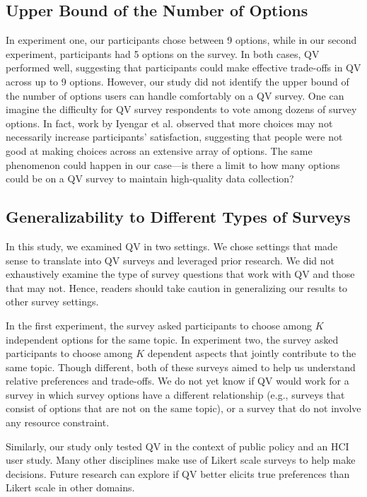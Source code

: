 \subsection{Upper Bound of the Number of Options}

In experiment one, our participants chose between 9 options, while in our second experiment, participants had 5 options on the survey. In both cases, QV performed well, suggesting that participants could make effective trade-offs in QV across up to 9 options. However, our study did not identify the upper bound of the number of options users can handle comfortably on a QV survey. One can imagine the difficulty for QV survey respondents to vote among dozens of survey options. In fact, work by Iyengar et al. \cite{iyengar2000choice} observed that more choices may not necessarily increase participants' satisfaction, suggesting that people were not good at making choices across an extensive array of options. The same phenomenon could happen in our case---is there a limit to how many options could be on a QV survey to maintain high-quality data collection?

\subsection{Generalizability to Different Types of Surveys}
In this study, we examined QV in two settings. We chose settings that made sense to translate into QV surveys and leveraged prior research. We did not exhaustively examine the type of survey questions that work with QV and those that may not. Hence, readers should take caution in generalizing our results to other survey settings.

{} In the first experiment, the survey asked participants to choose among $K$ independent options for the same topic. In experiment two, the survey asked participants to choose among $K$ dependent aspects that jointly contribute to the same topic. Though different, both of these surveys aimed to help us understand relative preferences and trade-offs. We do not yet know if QV would work for a survey in which survey options have a different relationship (e.g., surveys that consist of options that are not on the same topic), or a survey that do not involve any resource constraint.

Similarly, our study only tested QV in the context of public policy and an HCI user study. Many other disciplines make use of Likert scale surveys to help make {} decisions. Future research can explore if QV better elicits true preferences than Likert scale in other domains.



